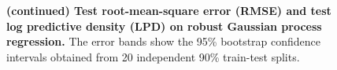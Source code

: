 %
\newpage
\begin{figure}[ht]
  \vspace{0.05in}\\
   \vspace{0.05in}\\
  \caption{\textbf{(continued) Test root-mean-square error (RMSE) and test log predictive density (LPD) on robust Gaussian process regression.}
  The error bands show the 95\% bootstrap confidence intervals obtained from 20 independent 90\% train-test splits.
  }
\end{figure}

